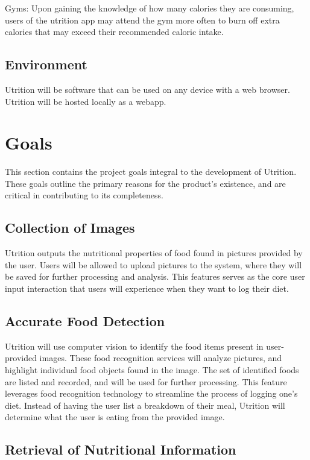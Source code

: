\documentclass{article}
\begin{document}
Gyms: Upon gaining the knowledge of how many calories they are consuming, users of the utrition app may attend the gym more often to burn off extra calories that may exceed their recommended caloric intake. 


\subsection{Environment}

Utrition will be software that can be used on any device with a web browser. Utrition will be hosted locally as a webapp. 

\section{Goals}

This section contains the project goals integral to the development of 
Utrition. These goals outline the primary reasons for the product's existence, 
and are critical in contributing to its completeness.

\subsection{Collection of Images}

Utrition outputs the nutritional properties of food found in pictures 
provided by the user. Users will be allowed to upload pictures to the system, 
where they will be saved for further processing and analysis. This features 
serves as the core user input interaction that users will experience when they 
want to log their diet.

\subsection{Accurate Food Detection}

Utrition will use computer vision to identify the food items present in 
user-provided images. These food recognition services will analyze pictures, 
and highlight individual food objects found in the image. The set of identified 
foods are listed and recorded, and will be used for further processing. This 
feature leverages food recognition technology to streamline the process of 
logging one's diet. Instead of having the user list a breakdown of their meal, 
Utrition will determine what the user is eating from the provided image.

\subsection{Retrieval of Nutritional Information}
\end{document}
